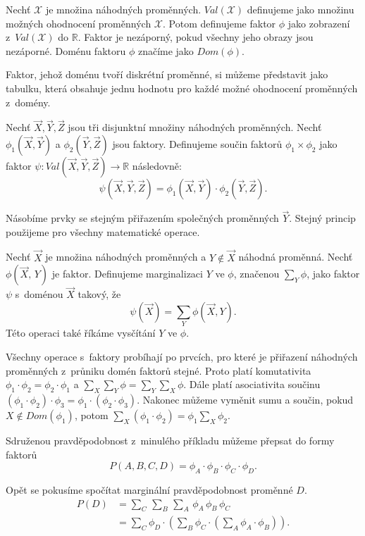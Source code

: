 Nechť $\mathcal{X}$ je množina náhodných proměnných. 
$Val(\mathcal{X})$ definujeme jako množinu možných ohodnocení proměnných $\mathcal{X}$.
Potom definujeme faktor $\phi$ jako zobrazení z~$Val(\mathcal{X})$ do $\mathbb{R}$. 
Faktor je nezáporný, pokud všechny jeho obrazy jsou nezáporné. 
Doménu faktoru $\phi$ značíme jako $Dom(\phi)$.

Faktor, jehož doménu tvoří diskrétní proměnné, si můžeme představit jako tabulku, která obsahuje jednu hodnotu pro každé možné ohodnocení proměnných z~domény.

Nechť $\vec{X}, \vec{Y}, \vec{Z}$ jsou tři disjunktní množiny náhodných proměnných.
Nechť $\phi_1(\vec{X}, \vec{Y})$ a $\phi_2(\vec{Y}, \vec{Z})$ jsou faktory.
Definujeme součin faktorů $\phi_1 \times \phi_2$ jako faktor $\psi: Val(\vec{X}, \vec{Y}, \vec{Z}) \rightarrow \mathbb{R}$ následovně:
\begin{equation*}
\psi(\vec{X}, \vec{Y}, \vec{Z}) = \phi_1(\vec{X}, \vec{Y}) \cdot \phi_2(\vec{Y}, \vec{Z}).
\end{equation*}

Násobíme prvky se stejným přiřazením společných proměnných $\vec{Y}$.
Stejný princip použijeme pro všechny matematické operace.

Nechť $\vec{X}$ je množina náhodných proměnných a $Y \not\in \vec{X}$ náhodná proměnná. 
Nechť $\phi(\vec{X}, \,Y)$ je faktor.
Definujeme marginalizaci $Y$ ve $\phi$, značenou $\sum_Y \phi$, jako faktor $\psi$ s~doménou $\vec{X}$ takový, že
\begin{equation*}
    \psi(\vec{X}) = \sum_Y \phi(\vec{X}, Y).
\end{equation*}
Této operaci také říkáme vysčítání $Y$ ve $\phi$.

Všechny operace s~faktory probíhají po prvcích, pro které je přiřazení náhodných proměnných z~průniku domén faktorů stejné.
Proto platí komutativita $\phi_1 \cdot \phi_2 = \phi_2 \cdot \phi_1$ a $\sum_X \sum_Y \phi = \sum_Y \sum_X \phi$.
Dále platí asociativita součinu $(\phi_1 \cdot \phi_2) \cdot \phi_3 = \phi_1 \cdot (\phi_2 \cdot \phi_3)$.
Nakonec můžeme vyměnit sumu a součin, pokud $X \not\in Dom(\phi_1)$, potom $\sum_X (\phi_1 \cdot \phi_2) = \phi_1 \sum_X \phi_2$.

Sdruženou pravděpodobnost z~minulého příkladu můžeme přepsat do formy faktorů
\begin{equation}
    P(A, B, C, D) = \phi_A \cdot \phi_B \cdot \phi_C \cdot \phi_D.
\end{equation}

Opět se pokusíme spočítat marginální pravděpodobnost proměnné $D$.
\begin{align}
P(D) &= \sum_C \, \sum_B \, \sum_A \, \phi_A \, \phi_B \, \phi_C
\\
&= \sum_C 
	\phi_D \cdot 
	\left( 
		\sum_B 
			\phi_C \cdot 
			\left( 
				\sum_A 
					\phi_A \cdot \phi_B
			\right)
	\right).
\end{align}

